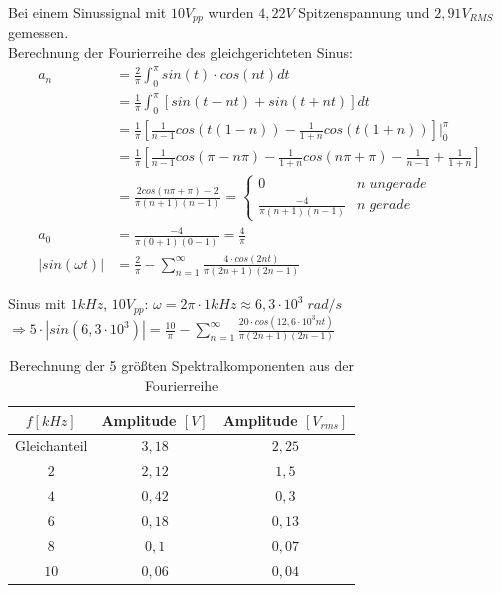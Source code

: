 \documentclass[12pt,a4paper,titlepage]{article}
\begin{document}
\noindent Bei einem Sinussignal mit $10V_{pp}$ wurden $4,22V$ Spitzenspannung und $2,91V_{RMS}$ gemessen.\\

\noindent Berechnung der Fourierreihe des gleichgerichteten Sinus:\\
\begin{align*}
    a_n &= \frac{2}{\pi}\int_{0}^{\pi}sin(t)\cdot cos(nt) dt\\
    &= \frac{1}{\pi}\int_{0}^{\pi}\left[sin(t - nt) + sin(t + nt)\right] dt\\
    &= \frac{1}{\pi}\left[\frac{1}{n-1}cos(t(1-n)) - \frac{1}{1+n}cos(t(1+n))\right]\biggr\rvert_{0}^{\pi}\\
    &= \frac{1}{\pi}\left[\frac{1}{n-1}cos(\pi-n\pi) - \frac{1}{1+n}cos(n\pi + \pi) - \frac{1}{n-1} + \frac{1}{1+n}\right]\\
    &= \frac{2cos(n\pi + \pi) - 2}{\pi(n+1)(n-1)} = \left\{
	    \begin{array}{ll}
		     0  & n \; ungerade \\
		     \frac{-4}{\pi(n+1)(n-1)} & n \; gerade
	    \end{array}
    \right.\\
    a_0 &= \frac{-4}{\pi(0+1)(0-1)} = \frac{4}{\pi}\\
    |sin(\omega t)| &= \frac{2}{\pi} - \sum_{n=1}^{\infty} \frac{4 \cdot cos(2n t)}{\pi(2n+1)(2n-1)}
\end{align*}

\noindent Sinus mit $1kHz$, $10V_{pp}$: $\omega = 2\pi\cdot1kHz \approx 6,3\cdot 10^3 \; rad/s  $\\
$\Rightarrow 5 \cdot |sin(6,3\cdot 10^3)| = \frac{10}{\pi} - \sum_{n=1}^{\infty} \frac{20 \cdot cos(12,6\cdot 10^3 n t)}{\pi(2n+1)(2n-1)}$

\begin{table}[H]
  \centering
  \begin{tabular}{c|c|c}
    $f [kHz]$ & Amplitude $[V]$ & Amplitude $[V_{rms}]$ \\
    \hline
    Gleichanteil & $3,18$ & $2,25$ \\
    \hline
    $2$ & $2,12$ & $1,5$ \\
    \hline
    $4$ & $0,42$ & $0,3$ \\
    \hline
    $6$ & $0,18$ & $0,13$ \\
    \hline
    $8$ & $0,1$ & $0,07$ \\
    \hline
    $10$ & $0,06$ & $0,04$ \\
  \end{tabular}
  \caption{Berechnung der 5 größten Spektralkomponenten aus der Fourierreihe}
\end{table}
\end{document}
